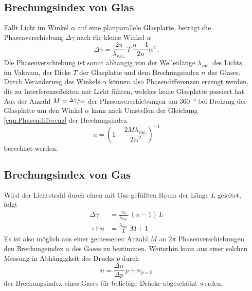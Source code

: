 \subsection{Brechungsindex von Glas}
Fällt Licht im Winkel $\alpha$ auf eine planparallele Glasplatte, beträgt die Phasenverschiebung $\Delta \gamma$ nach \cite{Anleitung} für kleine Winkel $\alpha$
\begin{equation} \label{eqn:Phasendifferenz}
  \Delta \gamma = \frac{2 \pi}{\lambda_\text{vac.}} \, T \, \frac{n-1}{2n} \alpha^2 \, .
\end{equation}
Die Phasenverschiebung ist somit abhängig von der Wellenlänge $\lambda_\text{vac.}$ des Lichts im Vakuum, der Dicke $T$ der Glasplatte und dem Brechungsindex $n$ des Glases.
Durch Veränderung des Winkels $\alpha$ können also Phasendifferenzen erzeugt werden, die zu Interferenzeffekten mit Licht führen, welches keine Glasplatte passiert hat.
Aus der Anzahl $M = \sfrac{\Delta \gamma}{2 \pi}$ der Phasenverschiebungen um \SI{360}{\degree} bei Drehung der Glasplatte um den Winkel $\alpha$ kann nach Umstellen der Gleichung \eqref{eqn:Phasendifferenz} der Brechungsindex
\begin{equation}\label{eqn:n_Glas}
  n = \left( 1 - \frac{2 M \lambda_\text{vac.}}{T \alpha^2} \right)^{-1}
\end{equation}
berechnet werden.


\subsection{Brechungsindex von Gas}

Wird der Lichtstrahl durch einen mit Gas gefüllten Raum der Länge $L$ geleitet, folgt
\begin{equation} \label{eqn:n_Gas}
  \begin{split}
  \Delta \gamma &= \frac{2 \pi}{\lambda_\text{vac.}} \, (n-1) \, L \\
  \leftrightarrow n &= \frac{\lambda_\text{vac.}}{L} \,  M + 1
  \end{split}
\end{equation}
Es ist also möglich aus einer gemessenen Anzahl $M$ an $2 \pi$ Phasenverschiebungen den Brechungsindex $n$ des Gases zu bestimmen.
Weiterhin kann aus einer solchen Messung in Abhängigkeit des Drucks $p$ durch
\begin{equation*}
  n = \frac{\Delta n}{\Delta p} \, p + n_{p=0}
\end{equation*}
der Brechungsindex eines Gases für beliebige Drücke abgeschätzt werden.
